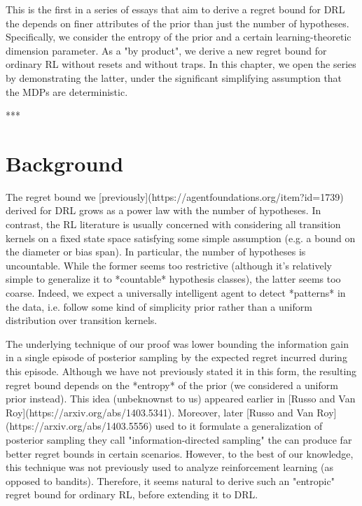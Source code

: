 \documentclass[a4paper]{article}
\begin{document}
This is the first in a series of essays that aim to derive a regret bound for DRL the depends on finer attributes of the prior than just the number of hypotheses. Specifically, we consider the entropy of the prior and a certain learning-theoretic dimension parameter. As a "by product", we derive a new regret bound for ordinary RL without resets and without traps. In this chapter, we open the series by demonstrating the latter, under the significant simplifying assumption that the MDPs are deterministic.

***

\section{Background}

The regret bound we [previously](https://agentfoundations.org/item?id=1739) derived for DRL grows as a power law with the number of hypotheses. In contrast, the RL literature is usually concerned with considering all transition kernels on a fixed state space satisfying some simple assumption (e.g. a bound on the diameter or bias span). In particular, the number of hypotheses is uncountable. While the former seems too restrictive (although it's relatively simple to generalize it to *countable* hypothesis classes), the latter seems too coarse. Indeed, we expect a universally intelligent agent to detect *patterns* in the data, i.e. follow some kind of simplicity prior rather than a uniform distribution over transition kernels.

The underlying technique of our proof was lower bounding the information gain in a single episode of posterior sampling by the expected regret incurred during this episode. Although we have not previously stated it in this form, the resulting regret bound depends on the *entropy* of the prior (we considered a uniform prior instead). This idea (unbeknownst to us) appeared earlier in [Russo and Van Roy](https://arxiv.org/abs/1403.5341). Moreover, later [Russo and Van Roy](https://arxiv.org/abs/1403.5556) used to it formulate a generalization of posterior sampling they call "information-directed sampling" the can produce far better regret bounds in certain scenarios. However, to the best of our knowledge, this technique was not previously used to analyze reinforcement learning (as opposed to bandits). Therefore, it seems natural to derive such an "entropic" regret bound for ordinary RL, before extending it to DRL.
\end{document}

